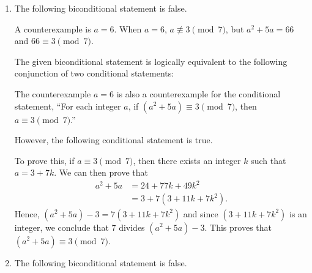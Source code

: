 \documentclass[11pt]{article}
\begin{document}
\begin{enumerate}
\item The following biconditional statement is false.

A counterexample is $a = 6$.  When $a = 6$, $a \not \equiv 3 \pmod 7$, but $a^2 + 5a = 66$ and 
$66 \equiv 3 \pmod 7$.

The given biconditional statement is logically equivalent to the following conjunction of two conditional statements:
The counterexample $a = 6$ is also a counterexample for the conditional statement, ``For each integer $a$, if 
$(a^2 + 5a) \equiv 3 \pmod 7$, then $a \equiv 3 \pmod 7$.''


\newpar
However, the following conditional statement is true.
To prove this, if $a \equiv 3 \pmod 7$, then there exists an integer $k$ such that $a = 3 + 7k$.  We can then prove that
\begin{align*}
a^2 + 5a &= 24 + 77k + 49k^2\\
         & = 3 + 7(3 + 11k + 7k^2).
\end{align*}
Hence, $\left( a^2 + 5a \right) - 3 = 7 \left( 3 + 11k + 7k^2 \right)$ and since 
$\left( 3 + 11k + 7k^2 \right)$ is an integer, we conclude that 7 divides $\left( a^2 + 5a \right) - 3$.  This proves that $(a^2 + 5a) \equiv 3 \pmod 7$.

%


\newpage
\item The following biconditional statement is false.


\end{enumerate}
\end{document}
